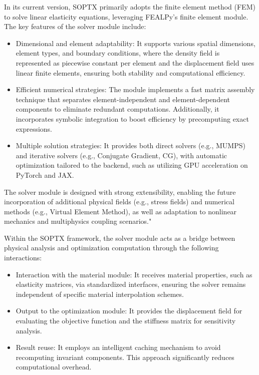 \documentclass[mathpazo]{cicp}
\begin{document}
In its current version, SOPTX primarily adopts the finite element method (FEM) to solve linear elasticity equations, leveraging FEALPy’s finite element module. The key features of the solver module include:
\begin{itemize}
	\item Dimensional and element adaptability: It supports various spatial dimensions, element types, and boundary conditions, where the density field is represented as piecewise constant per element and the displacement field uses linear finite elements, ensuring both stability and computational efficiency.
	\item Efficient numerical strategies: The module implements a fast matrix assembly technique that separates element-independent and element-dependent components to eliminate redundant computations. Additionally, it incorporates symbolic integration to boost efficiency by precomputing exact expressions.
	\item Multiple solution strategies: It provides both direct solvers (e.g., MUMPS) and iterative solvers (e.g., Conjugate Gradient, CG), with automatic optimization tailored to the backend, such as utilizing GPU acceleration on PyTorch and JAX.
\end{itemize}

The solver module is designed with strong extensibility, enabling the future incorporation of additional physical fields (e.g., stress fields) and numerical methods (e.g., Virtual Element Method), as well as adaptation to nonlinear mechanics and multiphysics coupling scenarios."

Within the SOPTX framework, the solver module acts as a bridge between physical analysis and optimization computation through the following interactions:
\begin{itemize}
	\item Interaction with the material module: It receives material properties, such as elasticity matrices, via standardized interfaces, ensuring the solver remains independent of specific material interpolation schemes.
	\item Output to the optimization module: It provides the displacement field for evaluating the objective function and the stiffness matrix for sensitivity analysis.
	\item Result reuse: It employs an intelligent caching mechanism to avoid recomputing invariant components. This approach significantly reduces computational overhead.
\end{itemize}
\end{document}
